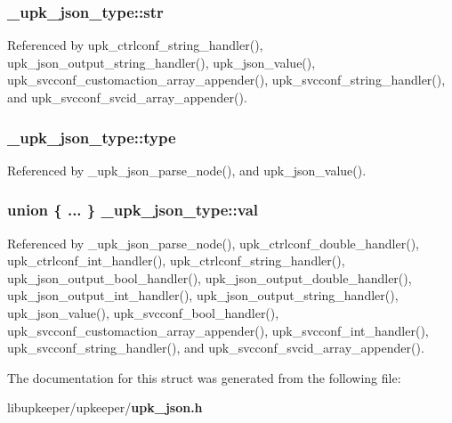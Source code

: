 \subsubsection[{str}]{ {\bf \_\-upk\_\-json\_\-type::str}}\label{struct__upk__json__type_a1defbbfede6d554468f8882ecb0596bb}


Referenced by upk\_\-ctrlconf\_\-string\_\-handler(), upk\_\-json\_\-output\_\-string\_\-handler(), upk\_\-json\_\-value(), upk\_\-svcconf\_\-customaction\_\-array\_\-appender(), upk\_\-svcconf\_\-string\_\-handler(), and upk\_\-svcconf\_\-svcid\_\-array\_\-appender().

\subsubsection[{type}]{ {\bf \_\-upk\_\-json\_\-type::type}}\label{struct__upk__json__type_a05591e8d4aab13a955e11c7f8b70d291}


Referenced by \_\-upk\_\-json\_\-parse\_\-node(), and upk\_\-json\_\-value().

\subsubsection[{val}]{\setlength{\rightskip}{0pt plus 5cm}union \{ ... \}   {\bf \_\-upk\_\-json\_\-type::val}}\label{struct__upk__json__type_a49660263d1f0e5f765469c372e0ccc29}


Referenced by \_\-upk\_\-json\_\-parse\_\-node(), upk\_\-ctrlconf\_\-double\_\-handler(), upk\_\-ctrlconf\_\-int\_\-handler(), upk\_\-ctrlconf\_\-string\_\-handler(), upk\_\-json\_\-output\_\-bool\_\-handler(), upk\_\-json\_\-output\_\-double\_\-handler(), upk\_\-json\_\-output\_\-int\_\-handler(), upk\_\-json\_\-output\_\-string\_\-handler(), upk\_\-json\_\-value(), upk\_\-svcconf\_\-bool\_\-handler(), upk\_\-svcconf\_\-customaction\_\-array\_\-appender(), upk\_\-svcconf\_\-int\_\-handler(), upk\_\-svcconf\_\-string\_\-handler(), and upk\_\-svcconf\_\-svcid\_\-array\_\-appender().



The documentation for this struct was generated from the following file:\begin{DoxyCompactItemize}
\item 
libupkeeper/upkeeper/{\bf upk\_\-json.h}\end{DoxyCompactItemize}
